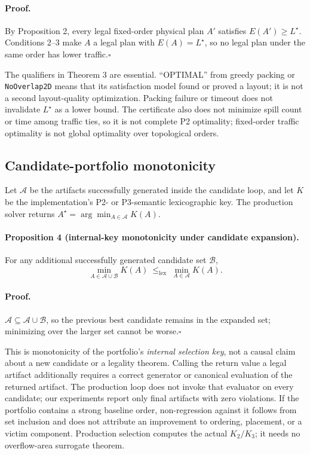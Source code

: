 \paragraph{Proof.}
By Proposition 2, every legal fixed-order physical plan $A'$ satisfies $E(A')\ge L^\star$. Conditions 2--3 make $A$ a legal plan with $E(A)=L^\star$, so no legal plan under the same order has lower traffic.\hfill$\square$

The qualifiers in Theorem 3 are essential. ``OPTIMAL'' from greedy packing or \texttt{NoOverlap2D} means that its satisfaction model found or proved a layout; it is not a second layout-quality optimization. Packing failure or timeout does not invalidate $L^\star$ as a lower bound. The certificate also does not minimize spill count or time among traffic ties, so it is not complete P2 optimality; fixed-order traffic optimality is not global optimality over topological orders.

\subsection{Candidate-portfolio monotonicity}

Let $\mathcal A$ be the artifacts successfully generated inside the candidate loop, and let $K$ be the implementation's P2- or P3-semantic lexicographic key. The production solver returns $A^\star=\arg\min_{A\in\mathcal A}K(A)$.

\paragraph{Proposition 4 (internal-key monotonicity under candidate expansion).}
For any additional successfully generated candidate set $\mathcal B$,
\begin{equation}
 \min_{A\in\mathcal A\cup\mathcal B}K(A)
 \ \le_{\mathrm{lex}}\
 \min_{A\in\mathcal A}K(A).
\end{equation}

\paragraph{Proof.}
$\mathcal A\subseteq\mathcal A\cup\mathcal B$, so the previous best candidate remains in the expanded set; minimizing over the larger set cannot be worse.\hfill$\square$

This is monotonicity of the portfolio's \emph{internal selection key}, not a causal claim about a new candidate or a legality theorem. Calling the return value a legal artifact additionally requires a correct generator or canonical evaluation of the returned artifact. The production loop does not invoke that evaluator on every candidate; our experiments report only final artifacts with zero violations. If the portfolio contains a strong baseline order, non-regression against it follows from set inclusion and does not attribute an improvement to ordering, placement, or a victim component. Production selection computes the actual $K_2/K_3$; it needs no overflow-area surrogate theorem.

